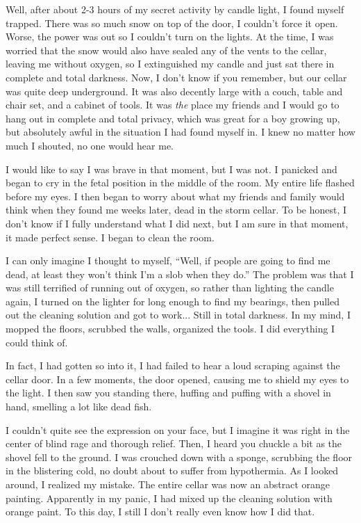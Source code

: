 Well, after about 2-3 hours of my secret activity by candle light, I found myself trapped.
There was so much snow on top of the door, I couldn't force it open.
Worse, the power was out so I couldn't turn on the lights.
At the time, I was worried that the snow would also have sealed any of the vents to the cellar, leaving me without oxygen, so I extinguished my candle and just sat there in complete and total darkness.
Now, I don't know if you remember, but our cellar was quite deep underground.
It was also decently large with a couch, table and chair set, and a cabinet of tools.
It was \textit{the} place my friends and I would go to hang out in complete and total privacy, which was great for a boy growing up, but absolutely awful in the situation I had found myself in.
I knew no matter how much I shouted, no one would hear me.

I would like to say I was brave in that moment, but I was not.
I panicked and began to cry in the fetal position in the middle of the room.
My entire life flashed before my eyes.
I then began to worry about what my friends and family would think when they found me weeks later, dead in the storm cellar.
To be honest, I don't know if I fully understand what I did next, but I am sure in that moment, it made perfect sense.
I began to clean the room.

I can only imagine I thought to myself, ``Well, if people are going to find me dead, at least they won't think I'm a slob when they do.''
The problem was that I was still terrified of running out of oxygen, so rather than lighting the candle again, I turned on the lighter for long enough to find my bearings, then pulled out the cleaning solution and got to work... Still in total darkness.
In my mind, I mopped the floors, scrubbed the walls, organized the tools.
I did everything I could think of.

In fact, I had gotten so into it, I had failed to hear a loud scraping against the cellar door.
In a few moments, the door opened, causing me to shield my eyes to the light.
I then saw you standing there, huffing and puffing with a shovel in hand, smelling a lot like dead fish.

I couldn't quite see the expression on your face, but I imagine it was right in the center of blind rage and thorough relief.
Then, I heard you chuckle a bit as the shovel fell to the ground.
I was crouched down with a sponge, scrubbing the floor in the blistering cold, no doubt about to suffer from hypothermia.
As I looked around, I realized my mistake.
The entire cellar was now an abstract orange painting.
Apparently in my panic, I had mixed up the cleaning solution with orange paint.
To this day, I still I don't really even know how I did that.

